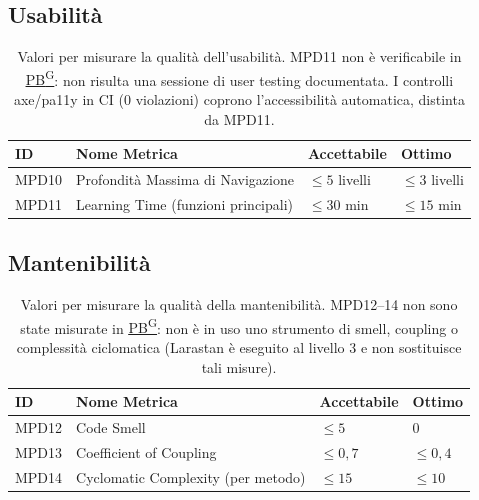 \documentclass[a4paper,12pt]{article}
\providecommand{\glslink}[2]{\href{https://alittlebyte-19.github.io/Documentazione/glossario.html\#gls-#1}{\underline{#2}\textsuperscript{\scriptsize G}}}
\begin{document}
\subsection{Usabilità}
\begin{table}[H]
    \centering
    \renewcommand{\arraystretch}{1.2}
    \begin{tabularx}{\textwidth}{|p{2.4cm}|X|p{3cm}|p{3cm}|}
        \hline
        \rowcolor{gray!20}
        \textbf{ID} & \textbf{Nome Metrica} & \textbf{Accettabile} & \textbf{Ottimo} \\
        \hline
        MPD10 & Profondità Massima di Navigazione & $\leq 5$ livelli & $\leq 3$ livelli \\
        MPD11 & Learning Time (funzioni principali) & $\leq 30$ min & $\leq 15$ min \\
        \hline
    \end{tabularx}
    \caption{Valori per misurare la qualità dell'usabilità. MPD11 non è verificabile in \glslink{pb-product-baseline}{PB}: non risulta una sessione di user testing documentata. I controlli axe/pa11y in CI (0 violazioni) coprono l'accessibilità automatica, distinta da MPD11.}
\end{table}

\subsection{Mantenibilità}
\begin{table}[H]
    \centering
    \renewcommand{\arraystretch}{1.2}
    \begin{tabularx}{\textwidth}{|p{2.4cm}|X|p{3cm}|p{3cm}|}
        \hline
        \rowcolor{gray!20}
        \textbf{ID} & \textbf{Nome Metrica} & \textbf{Accettabile} & \textbf{Ottimo} \\
        \hline
        MPD12 & Code Smell & $\leq 5$ & $0$ \\
        MPD13 & Coefficient of Coupling & $\leq 0{,}7$ & $\leq 0{,}4$ \\
        MPD14 & Cyclomatic Complexity (per metodo) & $\leq 15$ & $\leq 10$ \\
        \hline
    \end{tabularx}
    \caption{Valori per misurare la qualità della mantenibilità. MPD12--14 non sono state misurate in \glslink{pb-product-baseline}{PB}: non è in uso uno strumento di smell, coupling o complessità ciclomatica (Larastan è eseguito al livello 3 e non sostituisce tali misure).}
\end{table}
\end{document}
